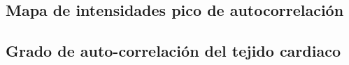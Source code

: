 \subsection{Mapa de intensidades pico de autocorrelación}

%
%
\subsection{Grado de auto-correlación del tejido cardiaco}


